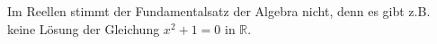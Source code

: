 Im Reellen stimmt der Fundamentalsatz der Algebra nicht, denn es gibt z.B. keine Lösung der Gleichung $x^2+1=0$ in $\mathbb{R}$.